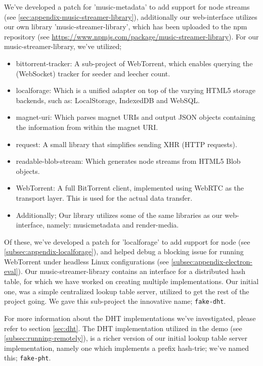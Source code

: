 We've developed a patch for 'music-metadata' to add support for node streams
(see \ref{sec:appendix-music-streamer-library}), additionally our web-interface
utilizes our own library 'music-streamer-library', which has been uploaded to
the npm repository (see \url{https://www.npmjs.com/package/music-streamer-library}).
\newline\newline
For our music-streamer-library, we've utilized;
\begin{itemize}
\item bittorrent-tracker: A sub-project of WebTorrent, which enables querying 
        the (WebSocket) tracker for seeder and leecher count.
\item localforage: Which is a unified adapter on top of the varying \acs{HTML}5
        storage backends, such as: LocalStorage, IndexedDB and WebSQL.
\item magnet-uri: Which parses magnet URIs and output \acs{JSON} objects containing
        the information from within the magnet URI.
\item request: A small library that simplifies sending XHR (\acs{HTTP} requests).
\item readable-blob-stream: Which generates node streams from \acs{HTML}5 Blob objects.
\item WebTorrent: A full BitTorrent client, implemented using WebRTC as the 
        transport layer. This is used for the actual data transfer.
\item Additionally; Our library utilizes some of the same libraries as our
        web-interface, namely: musicmetadata and render-media.
\end{itemize}
Of these, we've developed a patch for 'localforage' to add support for node
(see \ref{subsec:appendix-localforage}), and helped debug a blocking issue for
running WebTorrent under headless Linux configurations (see
\ref{subsec:appendix-electron-eval}).
\newline\newline
Our music-streamer-library contains an interface for a distributed hash table,
for which we have worked on creating multiple implementations. Our initial one,
was a simple centralized lookup table server, utilized to get the rest of the 
project going. We gave this sub-project the innovative name; \verb|fake-dht|.

For more information about the \acs{DHT} implementations we've investigated, please
refer to section \ref{sec:dht}.
\newline\newline
The \acs{DHT} implementation utilized in the demo (see \ref{subsec:running-remotely}),
is a richer version of our initial lookup table server implementation, namely
one which implements a prefix hash-trie; we've named this; \verb|fake-pht|.

